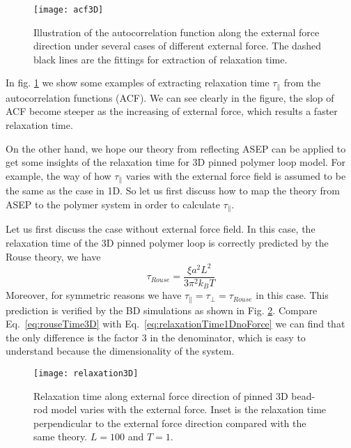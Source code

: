 \begin{figure}[htpb]
    \centering
    \texttt{[image: acf3D]}
    \caption{Illustration of the autocorrelation function along the external force direction under several cases of different external force. The dashed black lines are the fittings for extraction of relaxation time.}
    \label{fig:acf3D}
\end{figure}
In fig. \ref{fig:acf3D} we show some examples of extracting relaxation time $\tau_{\parallel}$ from the autocorrelation functions (ACF). We can see clearly in the figure, the slop of ACF become steeper as the increasing of external force, which results a faster relaxation time. 

On the other hand, we hope our theory from reflecting ASEP can be applied to get some insights of the relaxation time for 3D pinned polymer loop model. For example, the way of how $\tau_{\parallel}$ varies with the external force field is assumed to be the same as the case in 1D. So let us first discuss how to map the theory from ASEP to the polymer system in order to calculate $\tau_{\parallel}$.

Let us first discuss the case without external force field. In this case, the relaxation time of the 3D pinned polymer loop is correctly predicted by the Rouse theory, we have
\begin{equation}
    \label{eq:rouseTime3D}
    \tau_{Rouse} = \frac{\xi a^2 L^2}{3\pi^2 k_B T}
\end{equation}
Moreover, for symmetric reasons we have $\tau_{\parallel} = \tau_{\perp} = \tau_{Rouse}$ in this case. This prediction is verified by the BD simulations as shown in Fig. \ref{fig:relaxation3D}. Compare Eq.~\eqref{eq:rouseTime3D} with Eq.~\eqref{eq:relaxationTime1DnoForce} we can find that the only difference is the factor $3$ in the denominator, which is easy to understand because the dimensionality of the system.  
\begin{figure}[htpb]
    \centering
    \texttt{[image: relaxation3D]}
    \caption{Relaxation time along external force direction of pinned 3D bead-rod model varies with the external force. Inset is the relaxation time perpendicular to the external force direction compared with the same theory. $L=100$ and $T=1$.}
    \label{fig:relaxation3D}
\end{figure}

